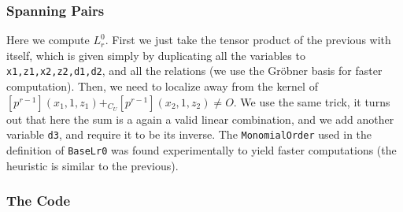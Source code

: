 \subsubsection{Spanning Pairs}

Here we compute $L_r^0$.
First we just take the tensor product of the previous with itself, which is given simply by duplicating all the variables to \texttt{x1,z1,x2,z2,d1,d2}, and all the relations (we use the Gr\"{o}bner basis for faster computation).
Then, we need to localize away from the kernel of $\left[p^{r-1}\right]\left(x_1,1,z_1\right) +_{C_U} \left[p^{r-1}\right]\left(x_2,1,z_2\right) \neq O$.
We use the same trick, it turns out that here the sum is a again a valid linear combination, and we add another variable \texttt{d3}, and require it to be its inverse.
The \texttt{MonomialOrder} used in the definition of \texttt{BaseLr0} was found experimentally to yield faster computations (the heuristic is similar to the previous).

\subsubsection{The Code}

